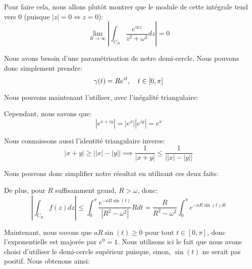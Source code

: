 \documentclass[a4paper]{article}
\begin{document}
{{        Pour faire cela, nous allons plutôt montrer que le module de cette intégrale tend vers 0 (puisque $\left|z\right| = 0 \iff z = 0$):
        \[\lim_{R \to \infty} \left|\int_{C_R} \frac{e^{i a z}}{z^2 + \omega^2} dz\right| = 0\]

        Nous avons besoin d'une paramétrisation de notre demi-cercle. Nous pouvons donc simplement prendre: 
        \[\gamma\left(t\right) = R e^{it}, \mathspace t \in \left[0, \pi\right]\]

        Nous pouvons maintenant l'utiliser, avec l'inégalité triangulaire: 

        Cependant, nous savons que: 
        \[\left|e^{x + iy}\right| = \left|e^x\right|\left|e^{iy}\right| = e^x\]

        Nous connaissons aussi l'identité triangulaire inverse: 
        \[\left|x + y\right| \geq \left|\left|x\right| - \left|y\right|\right| \implies \frac{1}{\left|x+y\right|} \leq \frac{1}{\left|\left|x\right| - \left|y\right|\right|}\]

        Nous pouvons donc simplifier notre résultat en utilisant ces deux faits:

        De plus, pour $R$ suffisamment grand, $R > \omega$, donc: 
        \[\left|\int_{C_R} f\left(z\right) dz\right| \leq \int_{0}^{\pi} \frac{e^{-a R \sin\left(t\right)}}{\left|R^2 - \omega^2\right|} R dt = \frac{R}{R^2 - \omega^2} \int_{0}^{\pi} e^{-a R \sin\left(t\right) dt}\]
        
        Maintenant, nous savons que $aR\sin\left(t\right) \geq 0$ pour tout $t \in \left[0, \pi\right]$, donc l'exponentielle est majorée par $e^0 = 1$. Nous utilisons ici le fait que nous avons choisi d'utiliser le demi-cercle supérieur puisque, sinon, $\sin\left(t\right)$ ne serait pas positif. Nous obtenons ainsi:
        
}}
\end{document}
